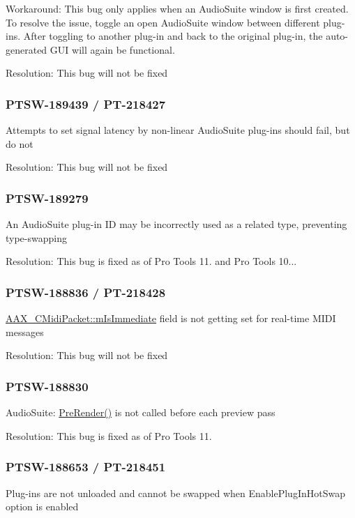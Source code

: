 Workaround\+: This bug only applies when an Audio\+Suite window is first created. To resolve the issue, toggle an open Audio\+Suite window between different plug-\/ins. After toggling to another plug-\/in and back to the original plug-\/in, the auto-\/generated G\+UI will again be functional.

Resolution\+: This bug will not be fixed\hypertarget{a00846_PTSW-189439}{}\subsubsection{P\+T\+S\+W-\/189439 / P\+T-\/218427}\label{a00846_PTSW-189439}
Attempts to set signal latency by non-\/linear Audio\+Suite plug-\/ins should fail, but do not

Resolution\+: This bug will not be fixed\hypertarget{a00846_PTSW-189279}{}\subsubsection{P\+T\+S\+W-\/189279}\label{a00846_PTSW-189279}
An Audio\+Suite plug-\/in ID may be incorrectly used as a related type, preventing type-\/swapping

Resolution\+: This bug is fixed as of Pro Tools 11. and Pro Tools 10...\hypertarget{a00846_PTSW-188836}{}\subsubsection{P\+T\+S\+W-\/188836 / P\+T-\/218428}\label{a00846_PTSW-188836}
\mbox{\hyperlink{a01429_ab6fce0aee8fb08695ac8a112b3c3e7fa}{A\+A\+X\+\_\+\+C\+Midi\+Packet\+::m\+Is\+Immediate}} field is not getting set for real-\/time M\+I\+DI messages

Resolution\+: This bug will not be fixed\hypertarget{a00846_PTSW-188830}{}\subsubsection{P\+T\+S\+W-\/188830}\label{a00846_PTSW-188830}
Audio\+Suite\+: \mbox{\hyperlink{a01693_aac48c69e51b81cc59c7b6807c1c7f9ed}{Pre\+Render()}} is not called before each preview pass

Resolution\+: This bug is fixed as of Pro Tools 11.\hypertarget{a00846_PTSW-188653}{}\subsubsection{P\+T\+S\+W-\/188653 / P\+T-\/218451}\label{a00846_PTSW-188653}
Plug-\/ins are not unloaded and cannot be swapped when Enable\+Plug\+In\+Hot\+Swap option is enabled

